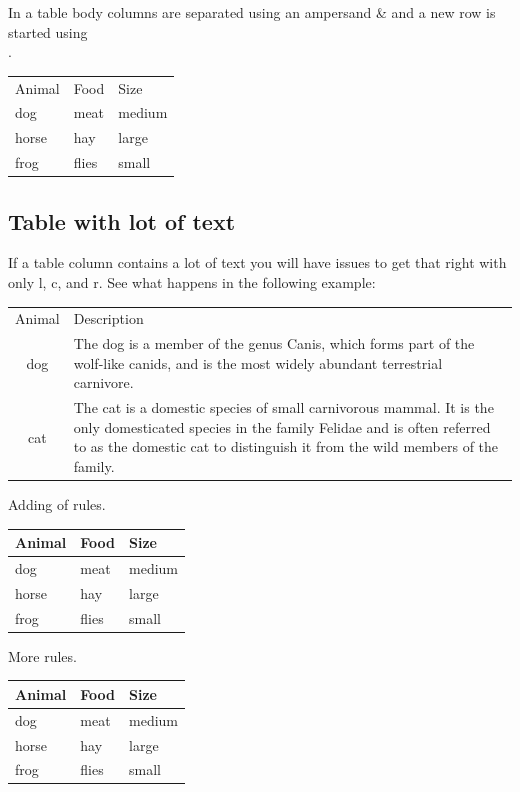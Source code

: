\documentclass[12]{article}
\begin{document}
    In a table body columns are separated using an ampersand \& and a new row is started using \\.

    \begin{tabular}{lll}
    Animal & Food  & Size   \\
    dog    & meat  & medium \\
    horse  & hay   & large  \\
    frog   & flies & small  \\
    \end{tabular}

    \subsection{Table with lot of text}%
    \label{sub:Table with lot of text}

    If a table column contains a lot of text you will have issues to get that right with only l, c, and r. See what happens in the following example:

    \begin{tabular}{cp{9cm}}
      Animal & Description \\
      dog    & The dog is a member of the genus Canis, which forms part of the
               wolf-like canids, and is the most widely abundant terrestrial
               carnivore. \\
      cat    & The cat is a domestic species of small carnivorous mammal. It is the
               only domesticated species in the family Felidae and is often referred
               to as the domestic cat to distinguish it from the wild members of the
               family. \\
    \end{tabular}

    Adding of rules.

    \begin{tabular}{lll}
      \toprule
      Animal & Food  & Size   \\
      \midrule
      dog    & meat  & medium \\
      horse  & hay   & large  \\
      frog   & flies & small  \\
      \bottomrule
    \end{tabular}


    More rules.

    \begin{tabular}{lll}
      \toprule
      Animal & Food  & Size   \\
      \midrule
      dog    & meat  & medium \\
      \cmidrule{1-2}
      horse  & hay   & large  \\
      \cmidrule{1-1}
      \cmidrule{3-3}
      frog   & flies & small  \\
      \bottomrule
    \end{tabular}
\end{document}
